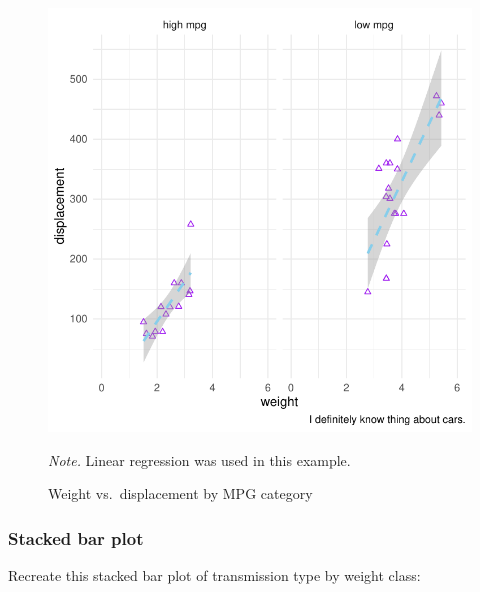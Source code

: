 \documentclass[
  man,
  floatsintext,
  longtable,
  nolmodern,
  notxfonts,
  notimes,
  colorlinks=true,linkcolor=blue,citecolor=blue,urlcolor=blue]{apa7}
\begin{document}
\begin{figure}[!htbp]

{\caption{{Weight vs.~displacement by MPG
category}{\label{fig-plot5-faceted-scatterplot}}}}

\includegraphics{data-visualization_files/figure-pdf/fig-plot5-faceted-scatterplot-1.pdf}

{\noindent \emph{Note.} Linear regression was used in this example.}

\end{figure}

\subsubsection{Stacked bar plot}\label{stacked-bar-plot}

Recreate this stacked bar plot of transmission type by weight class:
\end{document}
